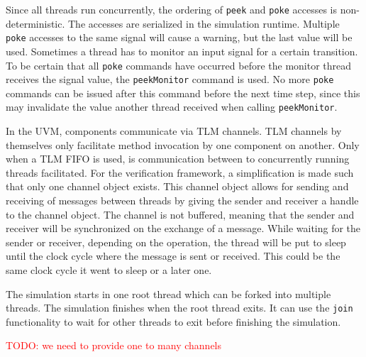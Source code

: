 \documentclass[11pt,a4paper]{report}
\newcommand{\ttt}{\texttt}
\newcommand{\todo}[1]{\textcolor{red}{TODO: #1}}
\begin{document}
Since all threads run concurrently, the ordering of \ttt{peek} and \ttt{poke} accesses is non-deterministic. The
accesses are serialized in the simulation runtime. Multiple \ttt{poke} accesses to the same signal will cause a
warning, but the last value will be used. Sometimes a thread has to monitor an input signal for a certain transition.
To be certain that all \ttt{poke} commands have occurred before the monitor thread receives the signal value, the
\ttt{peekMonitor} command is used. No more \ttt{poke} commands can be issued after this command before the next time
step, since this may invalidate the value another thread received when calling \ttt{peekMonitor}.

In the UVM, components communicate via TLM channels. TLM channels by themselves only facilitate method invocation by
one component on another. Only when a TLM FIFO is used, is communication between to concurrently running threads
facilitated. For the verification framework, a simplification is made such that only one channel object exists. This
channel object allows for sending and receiving of messages between threads by giving the sender and receiver a
handle to the channel object. The channel is not buffered, meaning that the sender and receiver will be synchronized
on the exchange of a message. While waiting for the sender or receiver, depending on the operation, the thread will
be put to sleep until the clock cycle where the message is sent or received. This could be the same clock cycle it
went to sleep or a later one.

The simulation starts in one root thread which can be forked into multiple threads. The simulation finishes when the
root thread exits. It can use the \ttt{join} functionality to wait for other threads to exit before finishing the simulation.


\todo{we need to provide one to many channels}

\end{document}
